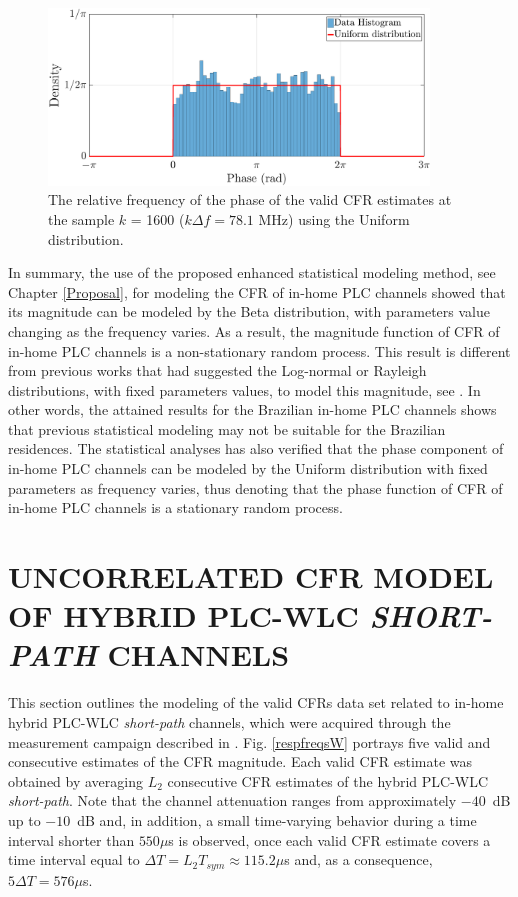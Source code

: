 \begin{figure}[h!]
	\centering
	\includegraphics[width=0.9\textwidth]{images/Phase_hist2_2.eps}
	\caption{The relative frequency of the phase of the valid CFR estimates at the sample $k$ = 1600 ($k\Delta f= 78.1$ MHz) using the Uniform distribution.}
	\label{phase_example2}
\end{figure}

In summary, the use of the proposed enhanced statistical modeling method, see Chapter \ref{Proposal}, for modeling the \ac{CFR} of in-home \ac{PLC} channels showed that its magnitude can be modeled by the Beta distribution, with parameters value changing as the frequency varies. As a result, the magnitude function of \ac{CFR} of in-home \ac{PLC} channels is a non-stationary random process. This result is different from previous works that had suggested the Log-normal or Rayleigh distributions, with fixed parameters values, to model this magnitude, see \cite{Galli:Wireline,RayleighPLC}. In other words, the attained results for the Brazilian in-home \ac{PLC} channels shows that previous statistical modeling may not be suitable for the Brazilian residences. The statistical analyses has also verified that the phase component of in-home \ac{PLC} channels can be modeled by the Uniform distribution with fixed parameters as frequency varies, thus denoting that the phase function  of \ac{CFR} of in-home \ac{PLC} channels is a stationary random process.

\section{UNCORRELATED CFR MODEL OF HYBRID PLC-WLC \textit{SHORT-PATH} CHANNELS} \label{sec:NR3}

This section outlines the modeling of the valid \acp{CFR} data set related to in-home hybrid \ac{PLC}-\ac{WLC} \textit{short-path} channels, which were acquired through the measurement campaign described in \cite{thiago:hyb}. Fig. \ref{respfreqsW} portrays five valid and consecutive estimates of the \ac{CFR} magnitude. Each valid \ac{CFR} estimate was obtained by averaging  $L_2$ consecutive \ac{CFR} estimates of the hybrid \ac{PLC}-\ac{WLC} \textit{short-path}. Note that the channel attenuation ranges from approximately $-40$~dB up to $-10$~dB and, in addition, a small time-varying behavior during a time interval shorter than $550\mu$s is observed, once each valid \ac{CFR} estimate covers a time interval equal to $\Delta T = L_2 T_{sym} \approx 115.2\mu$s and, as a consequence, $5\Delta T = 576\mu$s. 

